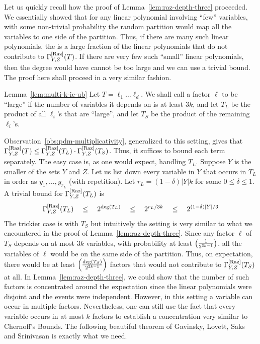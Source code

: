 Let us quickly recall how the proof of Lemma~\ref{lem:raz-depth-three} proceeded. We essentially showed that for any linear polynomial involving ``few'' variables, with some non-trivial probability the random partition would map all the variables to one side of the partition. Thus, if there are many such linear polynomials, the is a large fraction of the linear polynomials that do not contribute to $\Gamma^{\mathrm{[Raz]}}_{Y,Z}(T)$. If there are very few such ``small'' linear polynomials, then the degree would have cannot be too large and we can use a trivial bound. The proof here shall proceed in a very similar fashion. 


\begin{proofof}{Lemma~\ref{lem:multi-k-ic-ub}}
Let $T = \ell_1 \dots \ell_d$. We shall call a factor $\ell$ to be ``large'' if the number of variables it depends on is at least $3k$, and let $T_L$ be the product of all $\ell_i$'s that are ``large'', and let $T_S$ be the product of the remaining $\ell_i$'s. 


Observation~\ref{obs:pdm-multiplicativity}, generalized to this setting, gives that $\Gamma^{\mathrm{[Raz]}}_{Y,Z}(T) \leq \Gamma^{\mathrm{[Raz]}}_{Y,Z}(T_L) \cdot \Gamma^{\mathrm{[Raz]}}_{Y,Z}(T_S)$. Thus, it suffices to bound each term separately. The easy case is, as one would expect, handling $T_L$. Suppose $Y$ is the smaller of the sets $Y$ and $Z$. Let us list down every variable in $Y$ that occurs in $T_L$ in order as $y_1,\dots, y_{r_L}$ (with repetition). Let $r_L = (1-\delta) |Y|k$ for some $0\leq \delta \leq 1$. A trivial bound for $\Gamma^{\mathrm{[Raz]}}_{Y,Z}(T_L)$ is 
\begin{equation}\label{eqn:TL-bound}
\Gamma^{\mathrm{[Raz]}}_{Y,Z}(T_L)\quad \leq \quad 2^{\deg(T_L)} \quad \leq \quad 2^{r_L/3k} \quad \leq \quad 2^{(1-\delta)|Y|/3}
\end{equation}
The trickier case is with $T_S$ but intuitively the setting is very similar to what we encountered in the proof of Lemma~\ref{lem:raz-depth-three}. Since any factor $\ell$ of $T_S$ depends on at most $3k$ variables, with probability at least $\left(\frac{1}{2^{3k-1}}\right)$, all the variables of $\ell$ would be on the same side of the partition. Thus, on expectation, there would be at least $\left(\frac{\deg(T_S)}{2^{3k-1}}\right)$ factors that would not contribute to $\Gamma^{\mathrm{[Raz]}}_{Y,Z}(T_S)$ at all. In Lemma~\ref{lem:raz-depth-three}, we could show that the number of such factors is concentrated around the expectation since the linear polynomials were disjoint and the events were independent. However, in this setting a variable can occur in multiple factors. Nevertheless, one can still use the fact that every variable occurs in at most $k$ factors to establish a concentration very similar to Chernoff's Bounds. The following beautiful theorem of Gavinsky, Lovett, Saks and Srinivasan \cite{GLSS12} is exactly what we need. 


\end{proofof}
